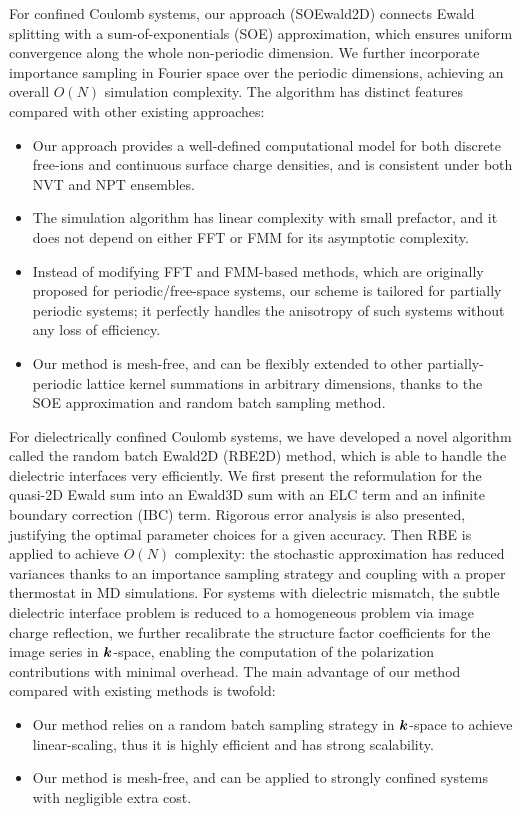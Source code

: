 For confined Coulomb systems, our approach (SOEwald2D) connects Ewald splitting with a sum-of-exponentials (SOE) approximation, which ensures uniform convergence along the whole non-periodic dimension. 
We further incorporate importance sampling in Fourier space over the periodic dimensions, achieving an overall $O(N)$ simulation complexity. 
The algorithm has distinct features compared with other existing approaches:
\begin{itemize}
	\item[1.] Our approach provides a well-defined computational model for both discrete free-ions and continuous surface charge densities, and is consistent under both NVT and NPT ensembles.
	\item[2.] The simulation algorithm has linear complexity with small prefactor, and it does not depend on either FFT or FMM for its asymptotic complexity.
	\item[3.] Instead of modifying FFT and FMM-based methods, which are originally proposed for periodic/free-space systems, our scheme is tailored for partially periodic systems; it perfectly handles the anisotropy of such systems without any loss of efficiency.
	\item[4.] Our method is mesh-free, and can be flexibly extended to other partially-periodic lattice kernel summations in arbitrary dimensions, thanks to the SOE approximation and random batch sampling method.
\end{itemize}

For dielectrically confined Coulomb systems, we have developed a novel algorithm called the random batch Ewald2D (RBE2D) method, which is able to handle the dielectric interfaces very efficiently.
We first present the reformulation for the quasi-2D Ewald sum into an Ewald3D sum with an ELC term and an infinite boundary correction (IBC) term. Rigorous error analysis is also presented, justifying the optimal parameter choices for a given accuracy.
Then RBE is applied to achieve $O(N)$ complexity: the stochastic approximation has reduced variances thanks to an importance sampling strategy and coupling with a proper thermostat in MD simulations.
For systems with dielectric mismatch, the subtle dielectric interface problem is reduced to a homogeneous problem via image charge reflection,
we further recalibrate the structure factor coefficients for the image series in $\boldsymbol{k}$-space, 
enabling the computation of the polarization contributions with minimal overhead. 
The main advantage of our method compared with existing methods is twofold: 
\begin{itemize}
	\item[1.] Our method relies on a random batch sampling strategy in $\boldsymbol{k}$-space to achieve linear-scaling, thus it is highly efficient and has strong scalability.
	\item[2.] Our method is mesh-free, and can be applied to strongly confined systems with negligible extra cost.
\end{itemize}

